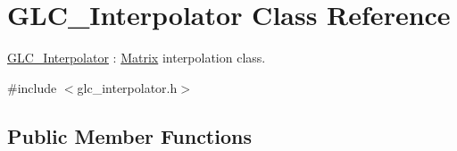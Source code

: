\hypertarget{class_g_l_c___interpolator}{\section{G\-L\-C\-\_\-\-Interpolator Class Reference}
\label{class_g_l_c___interpolator}
}


\hyperlink{class_g_l_c___interpolator}{G\-L\-C\-\_\-\-Interpolator} \-: \hyperlink{class_matrix}{Matrix} interpolation class.  




{\ttfamily \#include $<$glc\-\_\-interpolator.\-h$>$}

\subsection*{Public Member Functions}

